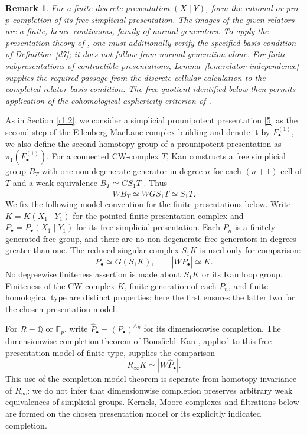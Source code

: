 \documentclass[11pt,a4paper]{article}
\newtheorem{remark}[theorem]{Remark}
\begin{document}
\begin{remark}\label{r7}
For a finite discrete presentation $(X\mid Y)$, form the rational or
pro-$p$ completion of its free simplicial presentation.  The images
of the given relators are a finite, hence continuous, family of normal
generators.  To apply the presentation theory of \cite{Mikh2023}, one
must additionally verify the specified basis condition of
Definition~\ref{d7}; it does not follow from normal generation alone.
For finite subpresentations of contractible presentations,
Lemma~\ref{lem:relator-independence} supplies the required passage from
the discrete cellular calculation to the completed relator-basis condition.
The free quotient identified below then permits application of the
cohomological asphericity criterion of
\cite[Propositions~15 and~16]{Mikh2023}.
\end{remark}
As in Section \ref{r1.2}, we consider a simplicial prounipotent presentation \eqref{5} as the second step of the Eilenberg-MacLane complex building and denote it by $F^{(1)}_{\bullet}$, we also define the second homotopy group of a prounipotent presentation as $\pi_1(F^{(1)}_{\bullet})$. 
For a connected CW-complex $T$, Kan constructs a free simplicial group
$B_T$ with one non-degenerate generator in degree $n$ for each
$(n+1)$-cell of $T$ and a weak equivalence
$B_T\simeq GS_1T$ \cite[Theorem~6.2]{Kan}.  Thus
\[
 \overline WB_T\simeq \overline WGS_1T\simeq S_1T.
\]
We fix the following model convention for the finite presentations below.
Write $K=K(X_1\mid Y_1)$ for the pointed finite presentation complex and
$P_\bullet=P_\bullet(X_1\mid Y_1)$ for its free simplicial presentation.
Each $P_n$ is a finitely generated free group, and there are no
non-degenerate free generators in degrees greater than one.  The reduced
singular complex $S_1K$ is used only for comparison:
\[
 P_\bullet\simeq G(S_1K),\qquad
 |\overline WP_\bullet|\simeq K.
\]
No degreewise finiteness assertion is made about $S_1K$ or its Kan loop
group.  Finiteness of the CW-complex $K$, finite generation of each $P_n$,
and finite homological type are distinct properties; here the first
ensures the latter two for the chosen presentation model.

For $R=\mathbb Q$ or $\mathbb F_p$, write
$\widehat P_\bullet=(P_\bullet)^{\wedge_R}$ for its dimensionwise
completion.  The dimensionwise completion theorem of Bousfield--Kan
\cite[Proposition~4.1]{BK}, applied to this free presentation model of
finite type, supplies the comparison
\[
 R_\infty K\simeq |\overline W\widehat P_\bullet|.
\]
This use of the completion-model theorem is separate from homotopy
invariance of $R_\infty$: we do not infer that dimensionwise completion
preserves arbitrary weak equivalences of simplicial groups.  Kernels,
Moore complexes and filtrations below are formed on the chosen
presentation model or its explicitly indicated completion.
\end{document}
